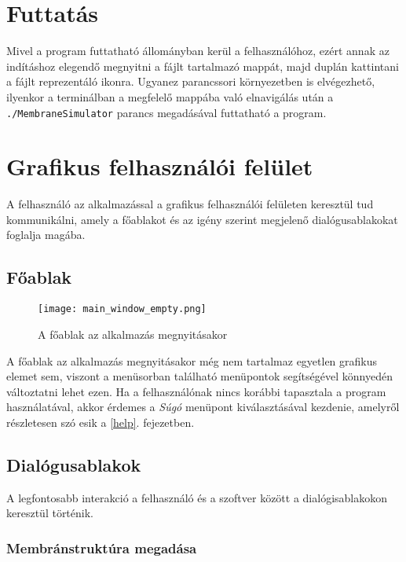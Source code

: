 \section{Futtatás}

Mivel a program futtatható állományban kerül a felhasználóhoz, ezért annak az indításhoz elegendő megnyitni a fájlt tartalmazó mappát, majd duplán kattintani a fájlt reprezentáló ikonra. Ugyanez parancssori környezetben is elvégezhető, ilyenkor a terminálban a megfelelő mappába való elnavigálás után a 
\verb|./MembraneSimulator| parancs megadásával futtatható a program.

\section{Grafikus felhasználói felület}

A felhasználó az alkalmazással a grafikus felhasználói felületen keresztül tud kommunikálni, amely a főablakot és az igény szerint megjelenő dialógusablakokat foglalja magába.

\subsection{Főablak}

\begin{figure}[H]
	\centering
	\texttt{[image: main\_window\_empty.png]}
	\caption{A főablak az alkalmazás megnyitásakor}
	\label{fig:main_window}
\end{figure}

A főablak az alkalmazás megnyitásakor még nem tartalmaz egyetlen grafikus elemet sem, viszont a menüsorban található menüpontok segítségével könnyedén változtatni lehet ezen. Ha a felhasználónak nincs korábbi tapasztala a program használatával, akkor érdemes a \textit{Súgó} menüpont kiválasztásával kezdenie, amelyről részletesen szó esik a \ref{help}. fejezetben.

\subsection{Dialógusablakok}

A legfontosabb interakció a felhasználó és a szoftver között a dialógisablakokon keresztül történik.  

\subsubsection{Membránstruktúra megadása}\label{create_structure}

